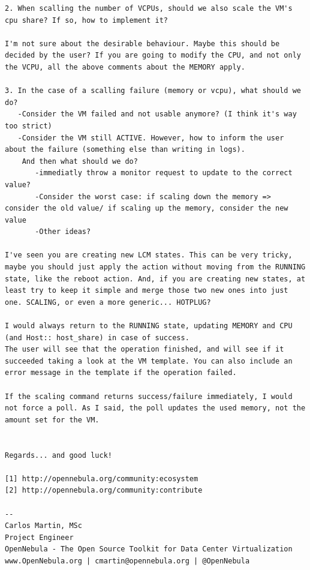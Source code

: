 \begin{lstlisting}
2. When scalling the number of VCPUs, should we also scale the VM's cpu share? If so, how to implement it?

I'm not sure about the desirable behaviour. Maybe this should be decided by the user? If you are going to modify the CPU, and not only the VCPU, all the above comments about the MEMORY apply.

3. In the case of a scalling failure (memory or vcpu), what should we do?
   -Consider the VM failed and not usable anymore? (I think it's way too strict)
   -Consider the VM still ACTIVE. However, how to inform the user about the failure (something else than writing in logs).
    And then what should we do?
       -immediatly throw a monitor request to update to the correct value?
       -Consider the worst case: if scaling down the memory => consider the old value/ if scaling up the memory, consider the new value
       -Other ideas?

I've seen you are creating new LCM states. This can be very tricky, maybe you should just apply the action without moving from the RUNNING state, like the reboot action. And, if you are creating new states, at least try to keep it simple and merge those two new ones into just one. SCALING, or even a more generic... HOTPLUG?

I would always return to the RUNNING state, updating MEMORY and CPU (and Host:: host_share) in case of success.
The user will see that the operation finished, and will see if it succeeded taking a look at the VM template. You can also include an error message in the template if the operation failed.

If the scaling command returns success/failure immediately, I would not force a poll. As I said, the poll updates the used memory, not the amount set for the VM.


Regards... and good luck!

[1] http://opennebula.org/community:ecosystem
[2] http://opennebula.org/community:contribute

--
Carlos Martin, MSc
Project Engineer
OpenNebula - The Open Source Toolkit for Data Center Virtualization
www.OpenNebula.org | cmartin@opennebula.org | @OpenNebula
\end{lstlisting}


